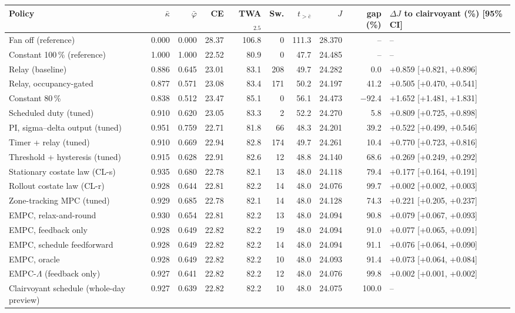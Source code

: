 \begin{tabular}{lrrrrrrrrl}
\toprule
Policy & $\bar\kappa$ & $\bar\varphi$ & CE & TWA$_{2.5}$ & Sw. & $t_{>\bar c}$ & $J$ & gap (\%) & $\Delta J$ to clairvoyant (\%) [95\% CI]\\
\midrule
Fan off (reference) & 0.000 & 0.000 & 28.37 & 106.8 & 0 & 111.3 & 28.370 & -- & --\\
Constant 100\,\% (reference) & 1.000 & 1.000 & 22.52 & 80.9 & 0 & 47.7 & 24.485 & -- & --\\
Relay (baseline) & 0.886 & 0.645 & 23.01 & 83.1 & 208 & 49.7 & 24.282 & 0.0 & +0.859 [+0.821, +0.896]\\
Relay, occupancy-gated & 0.877 & 0.571 & 23.08 & 83.4 & 171 & 50.2 & 24.197 & 41.2 & +0.505 [+0.470, +0.541]\\
Constant 80\,\% & 0.838 & 0.512 & 23.47 & 85.1 & 0 & 56.1 & 24.473 & \ensuremath{-}92.4 & +1.652 [+1.481, +1.831]\\
Scheduled duty (tuned) & 0.910 & 0.620 & 23.05 & 83.3 & 2 & 52.2 & 24.270 & 5.8 & +0.809 [+0.725, +0.898]\\
PI, sigma--delta output (tuned) & 0.951 & 0.759 & 22.71 & 81.8 & 66 & 48.3 & 24.201 & 39.2 & +0.522 [+0.499, +0.546]\\
Timer + relay (tuned) & 0.910 & 0.669 & 22.94 & 82.8 & 174 & 49.7 & 24.261 & 10.4 & +0.770 [+0.723, +0.816]\\
Threshold + hysteresis (tuned) & 0.915 & 0.628 & 22.91 & 82.6 & 12 & 48.8 & 24.140 & 68.6 & +0.269 [+0.249, +0.292]\\
Stationary costate law (CL-s) & 0.935 & 0.680 & 22.78 & 82.1 & 13 & 48.0 & 24.118 & 79.4 & +0.177 [+0.164, +0.191]\\
Rollout costate law (CL-r) & 0.928 & 0.644 & 22.81 & 82.2 & 14 & 48.0 & 24.076 & 99.7 & +0.002 [+0.002, +0.003]\\
Zone-tracking MPC (tuned) & 0.929 & 0.685 & 22.78 & 82.1 & 14 & 48.0 & 24.128 & 74.3 & +0.221 [+0.205, +0.237]\\
EMPC, relax-and-round & 0.930 & 0.654 & 22.81 & 82.2 & 13 & 48.0 & 24.094 & 90.8 & +0.079 [+0.067, +0.093]\\
EMPC, feedback only & 0.928 & 0.649 & 22.82 & 82.2 & 19 & 48.0 & 24.094 & 91.0 & +0.077 [+0.065, +0.091]\\
EMPC, schedule feedforward & 0.928 & 0.649 & 22.82 & 82.2 & 14 & 48.0 & 24.094 & 91.1 & +0.076 [+0.064, +0.090]\\
EMPC, oracle & 0.928 & 0.649 & 22.82 & 82.2 & 10 & 48.0 & 24.093 & 91.4 & +0.073 [+0.064, +0.084]\\
EMPC-$\Lambda$ (feedback only) & 0.927 & 0.641 & 22.82 & 82.2 & 12 & 48.0 & 24.076 & 99.8 & +0.002 [+0.001, +0.002]\\
Clairvoyant schedule (whole-day preview) & 0.927 & 0.639 & 22.82 & 82.2 & 10 & 48.0 & 24.075 & 100.0 & --\\
\bottomrule
\end{tabular}

